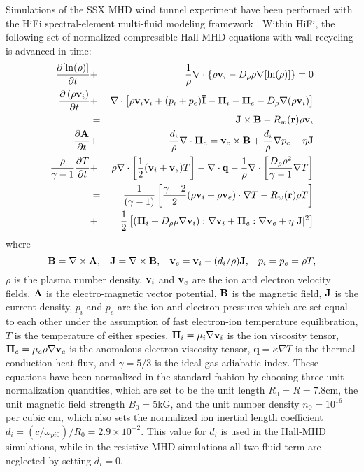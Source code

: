 
Simulations of the SSX MHD wind tunnel experiment have been performed with the HiFi spectral-element multi-fluid modeling framework \cite{Glasser04,Lukin08}.  Within HiFi, the following set of normalized compressible Hall-MHD equations with wall recycling is advanced in time:
\begin{eqnarray}
  \frac{\partial[\ln(\rho)]}{\partial t} &+& \frac{1}{\rho}\nabla\cdot
  \left\{\rho\mathbf{v}_i - D_\rho\rho\nabla[\ln(\rho)]\right\} = 0 
  \label{eq:Continuity}\\
  \frac{\partial\left(\rho\mathbf{v}_i\right)}{\partial t} &+&
  \nabla\cdot\left[\rho\mathbf{v}_i\mathbf{v}_i + (p_i + p_e)\mathbf{\bar{I}}
    - \mathbf{\Pi}_i -  \mathbf{\Pi}_e - D_\rho\nabla(\rho\mathbf{v}_i)\right] \nonumber \\ 
  &=& \mathbf{J}\times\mathbf{B} - R_w(\mathbf{r})\rho\mathbf{v}_i
  \label{eq:Momentum}\\
  \frac{\partial\mathbf{A}}{\partial t} &+& \frac{d_i}{\rho}\nabla\cdot\mathbf{\Pi}_e = \mathbf{v}_e\times\mathbf{B} + \frac{d_i}{\rho}\nabla p_e - \eta\mathbf{J} 
  \label{eq:OhmsLaw} \\
 \frac{\rho}{\gamma-1}\frac{\partial T}{\partial t} &+& \rho\nabla\cdot\left[\frac{1}{2}(\mathbf{v}_i + \mathbf{v}_e)T\right] 
    -  \nabla\cdot\mathbf{q} - \frac{1}{\rho}\nabla\cdot\left[\frac{D_\rho\rho^2}{\gamma-1}\nabla T\right]  \nonumber \\
    &=& \frac{1}{(\gamma-1)}\left[\frac{\gamma-2}{2}(\rho\mathbf{v}_i + \rho\mathbf{v}_e)\cdot\nabla T - R_w(\mathbf{r}) \rho T\right] \nonumber \\
    &+& \frac{1}{2}\left[\left(\mathbf{\Pi}_i + D_\rho\rho\nabla\mathbf{v}_i\right):\nabla\mathbf{v}_i + \mathbf{\Pi}_e:\nabla\mathbf{v}_e + \eta|\mathbf{J}|^2 \right]
    \label{eq:Tempr}
 \end{eqnarray}
where
\begin{equation*}
  \mathbf{B} = \nabla\times\mathbf{A}, \hspace{3mm} \mathbf{J} = \nabla\times\mathbf{B}, \hspace{3mm} \mathbf{v}_e = \mathbf{v}_i - (d_i/\rho)\mathbf{J}, \hspace{3mm} p_i = p_e = \rho T,
\end{equation*}
$\rho$ is the plasma number density, $\mathbf{v}_i$ and $\mathbf{v}_e$ are the ion and electron velocity fields, $\mathbf{A}$ is the electro-magnetic vector potential, $\mathbf{B}$ is the magnetic field, $\mathbf{J}$ is the current density, $p_i$ and $p_e$ are the ion and electron pressures which are set equal to each other under the assumption of fast electron-ion temperature equilibration, $T$ is the temperature of either species,  $\mathbf{\Pi}_i=\mu_i\nabla\mathbf{v}_i$ is the ion viscosity tensor, $\mathbf{\Pi}_e=\mu_e\rho\nabla\mathbf{v}_e$ is the anomalous electron viscosity tensor, $\mathbf{q}=\kappa\nabla T$ is the thermal conduction heat flux, and $\gamma=5/3$ is the ideal gas adiabatic index.  These equations have been normalized in the standard fashion \cite{Lukin11} by choosing three unit normalization quantities, which are set to be the unit length $R_0=R=7.8$cm, the unit magnetic field strength $B_0 = 5$kG, and the unit number density $n_0=10^{16}$ per cubic cm, which also sets the normalized ion inertial length coefficient $d_i=(c/\omega_{pi0})/R_0 = 2.9\times 10^{-2}$.  This value for $d_i$ is used in the Hall-MHD simulations, while in the resistive-MHD simulations all two-fluid term are neglected by setting $d_i=0$.

